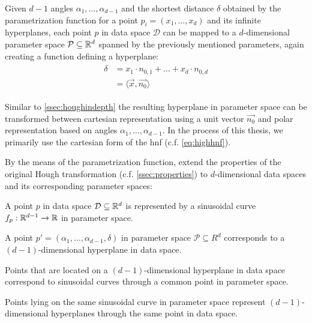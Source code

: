 Given $d-1$ angles $\alpha_1,\dotsc,\alpha_{d-1}$ and the shortest distance $\delta$ obtained by the parametrization function for a point $p_i = (x_1,\dotsc,x_d)$ and its infinite hyperplanes, each point $p$ in data space $\mathcal{D}$ can be mapped to a $d$-dimensional parameter space $\mathcal{P} \subseteq \mathbb{R}^d$ spanned by the previously mentioned parameters, again creating a function defining a hyperplane:
\begin{align}
    \begin{split}
        \delta &= x_1 \cdot n_{0,1} + \dots + x_d \cdot n_{0,d}\\
        &= \langle \vec{x},\vec{n_0} \rangle\label{eq:highhnf}
    \end{split}
\end{align}

Similar to \autoref{ssec:houghindepth} the resulting hyperplane in parameter space can be transformed between  cartesian representation using a unit vector $\vec{n_0}$ and polar representation based on angles $\alpha_1,\dotsc,\alpha_{d-1}$. In the process of this thesis, we primarily use the cartesian form of the \gls{hnf} (c.f. \autoref{eq:highhnf}).


By the means of the parametrization function, \citeauthor{CASHachtert2008robust} extend the properties of the original Hough transformation (c.f. \autoref{ssec:properties}) to $d$-dimensional data spaces and its corresponding parameter spaces: 
\begin{quoting}
\begin{property}
A point $p$ in data space $\mathcal{D} \subseteq \mathbb{R}^d$ is represented by a sinusoidal curve $f_p:\mathbb{R}^{d-1}\rightarrow\mathbb{R}$ in parameter space.
\end{property}
\begin{property}
A point $p' = (\alpha_1,\dotsc,\alpha_{d-1},\delta)$ in parameter space $\mathcal{P} \subseteq R^d$ corresponds to a $(d-1)$-dimensional hyperplane in data space.
\end{property}
\begin{property}
Points that are located on a $(d-1)$-dimensional hyperplane in data space correspond to sinusoidal curves through a common point in parameter space.
\end{property}
\begin{property}
Points lying on the same sinusoidal curve in parameter space represent $(d-1)$-dimensional hyperplanes through the same point in data space.
\end{property}
\end{quoting}

